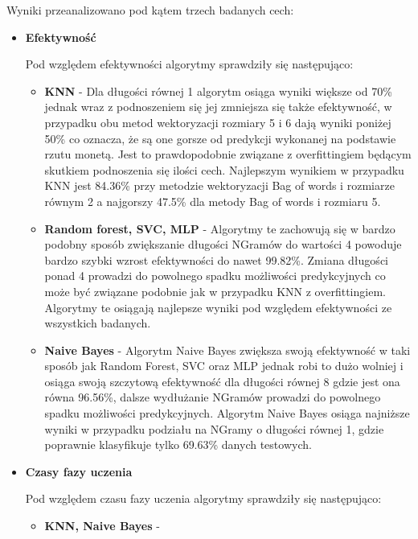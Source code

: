 Wyniki przeanalizowano pod kątem trzech badanych cech:

\begin{itemize}
    \item \textbf{Efektywność}
    
    Pod względem efektywności algorytmy sprawdziły się następująco:
    \begin{itemize}
        \item \textbf{KNN} -
        Dla długości równej 1 algorytm osiąga wyniki większe od 70\% jednak wraz 
        z podnoszeniem się jej zmniejsza się także efektywność, w przypadku obu metod 
        wektoryzacji rozmiary 5 i 6 dają wyniki poniżej 50\% co oznacza, że są one gorsze 
        od predykcji wykonanej na podstawie rzutu monetą. Jest to prawdopodobnie związane 
        z overfittingiem będącym skutkiem podnoszenia się ilości cech. Najlepszym wynikiem w 
        przypadku KNN jest 84.36\% przy metodzie wektoryzacji Bag of words i rozmiarze równym 2
        a najgorszy 47.5\%  dla metody Bag of words i rozmiaru 5.

        \item \textbf{Random forest, SVC, MLP} -        
        Algorytmy te zachowują się w bardzo podobny sposób zwiększanie długości NGramów 
        do wartości 4 powoduje bardzo szybki wzrost efektywności do nawet 99.82\%. Zmiana 
        długości ponad 4 prowadzi do powolnego spadku możliwości predykcyjnych co może być 
        związane podobnie jak w przypadku KNN z overfittingiem. Algorytmy te osiągają najlepsze 
        wyniki pod względem efektywności ze wszystkich badanych.
        \item \textbf{Naive Bayes} -
        Algorytm Naive Bayes zwiększa swoją efektywność w taki sposób jak Random Forest, SVC oraz MLP 
        jednak robi to dużo wolniej i osiąga swoją szczytową efektywność dla długości równej 8 gdzie 
        jest ona równa 96.56\%, dalsze wydłużanie NGramów prowadzi do powolnego spadku możliwości predykcyjnych.
        Algorytm Naive Bayes osiąga najniższe wyniki w przypadku podziału na NGramy o długości równej 1, gdzie 
        poprawnie klasyfikuje tylko 69.63\% danych testowych.
    \end{itemize}
    \item \textbf{Czasy fazy uczenia}
    
    Pod względem czasu fazy uczenia algorytmy sprawdziły się następująco:
    
    \begin{itemize}
        \item \textbf{KNN, Naive Bayes} -


\end{itemize}
\end{itemize}
